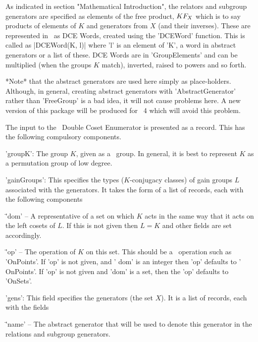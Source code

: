As  indicated in section   "Mathematical Introduction", the relators  and
subgroup generators  are   specified as elements  of  the  free  product,
$K\*F_X$ which is to say products of elements  of $K$ and generators from
$X$  (and their inverses).  These are represented  in \GAP\ as DCE Words,
created using  the 'DCEWord' function. This is  called as |DCEWord(K, l)|
where 'l' is an element of  'K', a word  in abstract generators or a list
of these.  DCE  Words are in 'GroupElements'  and can be multiplied (when
the groups $K$ match), inverted, raised to powers and so forth.

*Note*  that    the  abstract  generators are      used  here  simply  as
place-holders.  Although,  in general, creating abstract  generators with
'AbstractGenerator' rather than 'FreeGroup' is   a bad idea, it will  not
cause problems here.  A new version of this package  will be produced for
\GAP\ 4 which will avoid this problem.


The input to   the  \GAP\ Double   Coset Enumerator  is  presented   as a
record. This has the following compulsory components.

'groupK': The group $K$,  given as a \GAP\  group. In general, it is best
to represent $K$ as a permutation group of low degree.

'gainGroups': This specifies the   types ($K$-conjugacy classes)  of gain
groups $L$ associated with the generators. It takes the form of a list of
records, each with the following components\:

\= 'dom' -- A representative  of a set on which $K$ acts  in the same way
that it acts on the left cosets of $L$.  If this  is not given then $L=K$
and other fields are set accordingly.

\= 'op' -- The operation of  $K$  on  this  set.  This  should be a \GAP\
operation such as  'OnPoints'. If 'op'  is not  given,  and ' dom'  is an
integer then 'op' defaults to ' OnPoints'. If 'op' is not given and 'dom'
is a set, then the 'op' defaults to 'OnSets'.

'gens': This field specifies  the generators (the set $X$).  It is a list
of records, each with the fields\:

\= 'name' --  The abstract generator  that  will  be used  to denote this
generator in the relations and subgroup generators.

